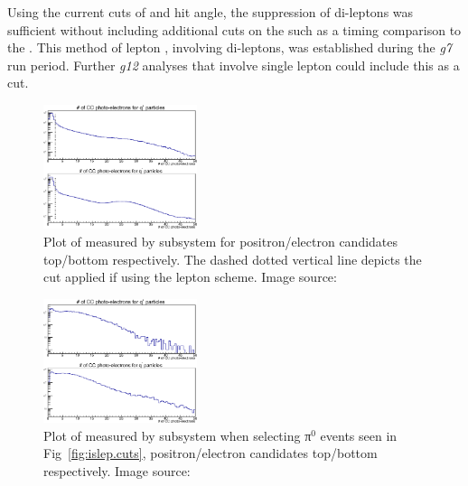 \begin{v2}Using the current cuts of  and hit angle, the suppression of di-leptons was sufficient without including additional cuts on the  such as a timing comparison to the . This method of lepton , involving di-leptons, was established during the \textit{g7} run period. Further \textit{g12} analyses that involve single lepton  could include this as a cut.\end{v2}

%
\begin{figure}\begin{center}
\includegraphics[width=0.4\textwidth]{figures/lepton/CC_nPE.eps}
\caption[Number of Photo-electrons Measured by  for All e$^-$ and e$^+$ Candidates]{\label{fig:islep.CC}Plot of  measured by   subsystem for positron/electron candidates top/bottom respectively. The dashed dotted vertical line depicts the cut applied if using the  lepton  scheme. Image source:~\cite{clas.thesis.kunkel}}
\end{center}\end{figure}

\begin{figure}\begin{center}
\includegraphics[width=0.4\textwidth]{figures/lepton/CC_NPEcut.eps}
\caption[Number of Photo-electrons Measured by  for π$^0$ Events]{\label{fig:islep.CC1}Plot of  measured by   subsystem when selecting π$^0$ events seen in Fig~\ref{fig:islep.cuts}, positron/electron candidates top/bottom respectively. Image source:~\cite{clas.thesis.kunkel}}
\end{center}\end{figure}


